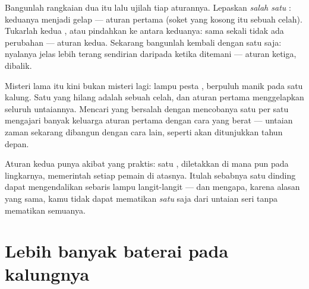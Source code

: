 \begin{example}\label{ex:g4:series-circuits:seeing}
Bangunlah rangkaian dua  itu lalu ujilah tiap aturannya.
Lepaskan \emph{salah satu} : keduanya menjadi gelap ---
aturan pertama (soket yang kosong itu sebuah celah). Tukarlah kedua
, atau pindahkan  ke antara keduanya: sama sekali
tidak ada perubahan --- aturan kedua. Sekarang bangunlah kembali
dengan satu  saja: nyalanya jelas lebih terang sendirian
daripada ketika ditemani --- aturan ketiga, dibalik.
\end{example}

\begin{example}\label{ex:g4:series-circuits:partylights}
Misteri lama itu kini bukan misteri lagi:  lampu pesta , berpuluh manik pada satu kalung. Satu  yang hilang adalah
sebuah celah, dan aturan pertama menggelapkan seluruh untaiannya.
Mencari  yang bersalah dengan mencobanya satu per satu mengajari
banyak keluarga aturan pertama dengan cara yang berat --- untaian
zaman sekarang dibangun dengan cara lain, seperti akan ditunjukkan
tahun depan.
\end{example}

\begin{remark}\label{rem:g4:series-circuits:switch}
Aturan kedua punya akibat yang praktis: satu , diletakkan di
mana pun pada lingkarnya, memerintah setiap pemain di atasnya. Itulah
sebabnya satu  dinding dapat mengendalikan sebaris lampu
langit-langit --- dan mengapa, karena alasan yang sama, kamu tidak
dapat mematikan \emph{satu}  saja dari untaian seri tanpa
mematikan semuanya.
\end{remark}

\section{Lebih banyak baterai pada kalungnya}

